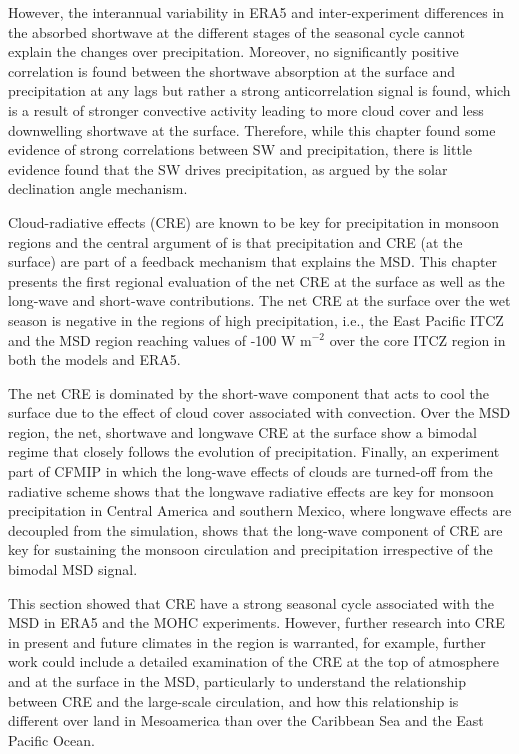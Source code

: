  However, the interannual variability in ERA5 and inter-experiment differences in the absorbed shortwave at the different stages of the seasonal cycle cannot explain the changes over precipitation. Moreover, no significantly positive correlation is found between the shortwave absorption at the surface and precipitation at any lags but rather a strong anticorrelation signal is found, which is a result of stronger convective activity leading to more cloud cover and less downwelling shortwave at the surface. 
 Therefore, while this chapter found some evidence of strong correlations between SW and precipitation, there is little evidence found that the SW drives precipitation, as argued by the solar declination angle mechanism.

Cloud-radiative effects (CRE) are known to be key for precipitation in monsoon regions and the central argument of \cite{magana1999} is that precipitation and CRE (at the surface) are part of a feedback mechanism that explains the MSD. This chapter presents the first regional evaluation of the net CRE at the surface as well as the long-wave and short-wave contributions. The net CRE at the surface over the wet season is negative in the regions of high precipitation, i.e., the East Pacific ITCZ and the MSD region reaching values of -100 W m$^{-2}$ over the core ITCZ region in both the models and ERA5.

 The net CRE is dominated by the short-wave component that acts to cool the surface due to the effect of cloud cover associated with convection. Over the MSD region, the net, shortwave and longwave CRE at the surface show a bimodal regime that closely follows the evolution of precipitation. Finally, an experiment part of CFMIP in which the long-wave effects of clouds are turned-off from the radiative scheme shows that the longwave radiative effects are key for monsoon precipitation in Central America and southern Mexico,  where longwave effects are decoupled from the simulation, shows that the long-wave component of CRE are key for sustaining the monsoon circulation and precipitation irrespective of the bimodal MSD signal.

This section showed that CRE have a strong seasonal cycle associated with the MSD in ERA5 and the MOHC experiments. However, further research into CRE in present and future climates in the region is warranted, for example, further work could include a detailed examination of the CRE at the top of atmosphere and at the surface in the MSD, particularly to understand the relationship between CRE and the large-scale circulation, and how this relationship is different over land in Mesoamerica than over the Caribbean Sea and the East Pacific Ocean.

